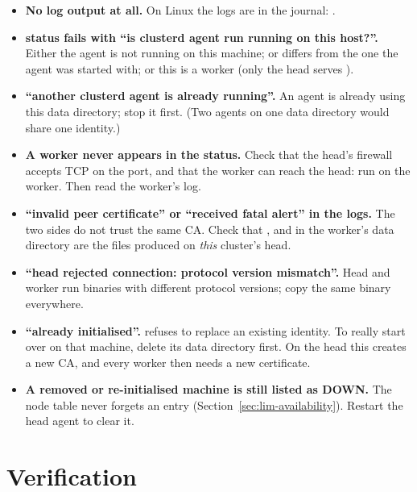 \documentclass{article}
\begin{document}
\begin{itemize}
  \item \textbf{No log output at all.}
    On Linux the logs are in the journal: .
  \item \textbf{status fails with ``is clusterd agent run running on this
    host?''.}
    Either the agent is not running on this machine; or 
    differs from the one the agent was started with; or this is a worker
    (only the head serves ).
  \item \textbf{``another clusterd agent is already running''.}
    An agent is already using this data directory; stop it first. (Two
    agents on one data directory would share one identity.)
  \item \textbf{A worker never appears in the status.}
    Check that the head's firewall accepts TCP on the 
    port, and that the worker can reach the head: run
     on the worker. Then read the worker's
    log.
  \item \textbf{``invalid peer certificate'' or ``received fatal alert''
    in the logs.}
    The two sides do not trust the same CA. Check that ,
     and  in the worker's data directory are
    the files  produced on \emph{this} cluster's head.
  \item \textbf{``head rejected connection: protocol version mismatch''.}
    Head and worker run binaries with different protocol versions; copy
    the same binary everywhere.
  \item \textbf{``already initialised''.}
     refuses to replace an existing identity. To really start
    over on that machine, delete its data directory first. On the head
    this creates a new CA, and every worker then needs a new
    certificate.
  \item \textbf{A removed or re-initialised machine is still listed as
    DOWN.}
    The node table never forgets an entry
    (Section~\ref{sec:lim-availability}). Restart the head agent to
    clear it.
\end{itemize}

\section{Verification}
\end{document}

